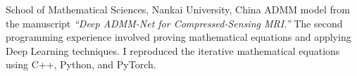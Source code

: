 \documentclass[11pt,a4paper, final]{moderncv}
\begin{document}
	{}{}{School of Mathematical Sciences, Nankai University, China}
	{ADMM model from the manuscript \emph{``Deep ADMM-Net for Compressed-Sensing MRI.''}}
	{The second programming experience involved proving mathematical equations and applying Deep Learning techniques. 
	I reproduced the iterative mathematical equations using C++, Python, and PyTorch.}
\end{document}
